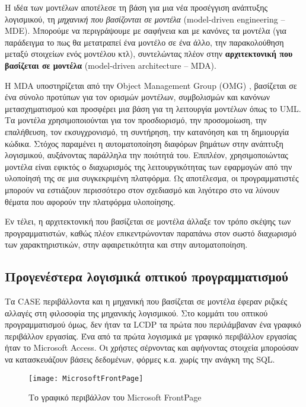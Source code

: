             Η ιδέα των μοντέλων αποτέλεσε τη βάση για μια νέα προσέγγιση ανάπτυξης λογισμικού, τη \textit{μηχανική που βασίζονται σε μοντέλα} (model-driven engineering -- MDE). Μπορούμε να περιγράψουμε με σαφήνεια και με κανόνες τα μοντέλα (για παράδειγμα το πως θα μετατραπεί ένα μοντέλο σε ένα άλλο, την παρακολούθηση μεταξύ στοιχείων ενός μοντέλου κτλ), συντελώντας πλέον στην \textbf{αρχιτεκτονική που βασίζεται σε μοντέλα} (model-driven architecture -- MDA).

            Η MDA υποστηρίζεται από την Object Management Group (OMG) \cite{OMG_MDA}, βασίζεται σε ένα σύνολο προτύπων για τον ορισμών μοντέλων, συμβολισμών και κανόνων μετασχηματισμού και προσφέρει μια βάση για τη λειτουργία μοντέλων όπως το UML. Τα μοντέλα χρησιμοποιούνται για τον προσδιορισμό, την προσομοίωση, την επαλήθευση, τον εκσυγχρονισμό, τη συντήρηση, την κατανόηση και τη δημιουργία κώδικα. Στόχος παραμένει η αυτοματοποίηση διαφόρων βημάτων στην ανάπτυξη λογισμικού, αυξάνοντας παράλληλα την ποιότητά του. Επιπλέον, χρησιμοποιώντας μοντέλα είναι εφικτός ο διαχωρισμός της λειτουργικότητας των εφαρμογών από την υλοποίησή της σε μια συγκεκριμένη πλατφόρμα. Ως αποτέλεσμα, οι προγραμματιστές μπορούν να εστιάζουν περισσότερο στον σχεδιασμό και λιγότερο στο να λύνουν θέματα που αφορούν την πλατφόρμα υλοποίησης.

            Εν τέλει, η αρχιτεκτονική που βασίζεται σε μοντέλα άλλαξε τον τρόπο σκέψης των προγραμματιστών, καθώς πλέον επικεντρώνονταν παραπάνω στον σωστό διαχωρισμό των χαρακτηριστικών, στην αφαιρετικότητα και στην αυτοματοποίηση.
            \cite{Bucaioni2022, MDELow, MDSDSpringer}

        \subsection{Προγενέστερα λογισμικά οπτικού προγραμματισμού}
            Τα CASE περιβάλλοντα και η μηχανική που βασίζεται σε μοντέλα έφεραν ριζικές αλλαγές στη φιλοσοφία της μηχανικής λογισμικού. Στο κομμάτι του οπτικού προγραμματισμού όμως, δεν ήταν τα LCDP τα πρώτα που περιλάμβαναν ένα γραφικό περιβάλλον εργασίας. Ένα από τα πρώτα λογισμικά με γραφικό περιβάλλον εργασίας ήταν το Microsoft Access. Οι χρήστες σέρνοντας και αφήνοντας στοιχεία μπορούσαν να κατασκευάζουν βάσεις δεδομένων, φόρμες κ.α. χωρίς την ανάγκη της SQL.

            \begin{figure}[h!] \noindent \centering
                    \texttt{[image: MicrosoftFrontPage]}
                    \caption{\centering Το γραφικό περιβάλλον του Microsoft FrontPage}
            \end{figure}

